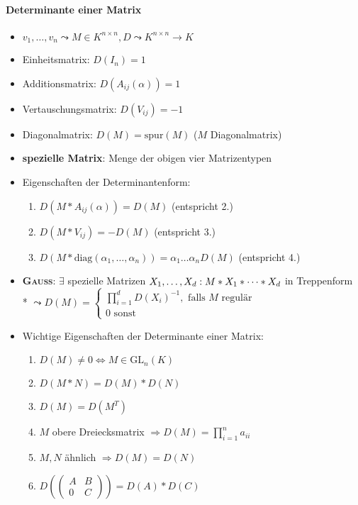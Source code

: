 \paragraph{Determinante einer Matrix}
\begin{itemize}
	\item $v_1, \dots, v_n \leadsto M \in K^{n \times n}, D \leadsto K^{n \times n} \rightarrow K$
	\item Einheitsmatrix: $D(I_n) = 1$
	\item Additionsmatrix: $D(A_{ij}(\alpha)) = 1$
	\item Vertauschungsmatrix: $D(V_{ij}) = -1$
	\item Diagonalmatrix: $D(M) = \text{spur}(M)$ ($M$ Diagonalmatrix)
	\item \textbf{spezielle Matrix}: Menge der obigen vier Matrizentypen
	\item Eigenschaften der Determinantenform:
	\begin{enumerate}
		\item $D(M*A_{ij}(\alpha)) = D(M)$ (entspricht 2.)
		\item $D(M*V_{ij}) = - D(M)$ (entspricht  3.)
		\item $D(M*\text{diag}(\alpha_1, \dots, \alpha_n))= \alpha_1 \dots \alpha_n D(M)$ (entspricht 4.)
	\end{enumerate}
	\item \textbf{\textsc{Gauß}}: $\exists$ spezielle Matrizen $X_1, \dots, X_d: \\* M * X_1 * \cdots * X_d$ in Treppenform \\* $\leadsto D(M) = \begin{cases} \prod_{i=1}^d D(X_i)^{-1}, \text{ falls $M$ regulär} \\ 0 \text{ sonst} \end{cases}$
	\item Wichtige Eigenschaften der Determinante einer Matrix:
	\begin{enumerate}
		\item $D(M) \neq 0 \Leftrightarrow M \in \text{GL}_n(K)$
		\item $D(M*N)=D(M)*D(N)$
		\item $D(M)=D(M^T)$
		\item $M$ obere Dreiecksmatrix $\Rightarrow D(M)=\prod_{i=1}^n a_{ii}$
		\item $M, N$ ähnlich $\Rightarrow D(M)=D(N)$
		\item $D\left(\begin{pmatrix} A & B \\ 0 & C \end{pmatrix}\right) = D(A)*D(C)$
	\end{enumerate}
\end{itemize}


